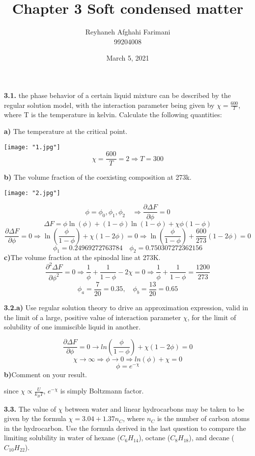 \documentclass[a4paper,12pt]{report}
\title{\large{\textbf{Chapter 3 Soft condensed matter}}}
\author{Reyhaneh Afghahi Farimani\\ 99204008}
\date{March 5, 2021}
\begin{document}
\maketitle
\textbf{3.1.} the phase behavior of a certain liquid mixture can be described by the regular solution model,
 with the interaction parameter being given by $\chi = \frac{600}{T}$,
  where T is the temperature in kelvin. Calculate the following quantities:

\textbf{a)} The temperature at the critical point.

\texttt{[image: "1.jpg"]}
\[
\chi = \frac{600}{T} = 2 \Rightarrow T =300
\]

\textbf{b)} The volume fraction of the coexisting composition at 273k.

\texttt{[image: "2.jpg"]}

\[\phi = \phi_0 , \phi_1 , \phi_2\quad 
\Rightarrow \frac{\partial \Delta F}{\partial \phi} = 0\]
\[
\Delta F = \phi \ln(\phi) +(1- \phi)\ln(1- \phi) + \chi \phi (1- \phi)
\]
\[
\frac{\partial \Delta F}{\partial \phi} = 0 
\Rightarrow \ln(\frac{\phi}{1-\phi}) + \chi (1 - 2\phi) =0  
\Rightarrow \ln(\frac{\phi}{1-\phi}) + \frac{600}{273} (1 - 2\phi) =0 
\]
\[
\phi_1 =  0.24969272763784 \quad \phi_2 = 0.750307272362156
\]
\textbf{c)}The volume fraction at the spinodal line at 273K.
\[
\frac{\partial^2 \Delta F}{\partial \phi^2} = 0 
\Rightarrow \frac{1}{\phi} + \frac{1}{1- \phi} -2\chi =0 
\Rightarrow \frac{1}{\phi} + \frac{1}{1- \phi} = \frac{1200}{273}
\]
\[
\phi_a = \frac{7}{20} =0.35 ,\quad \phi_b = \frac{13}{20} =0.65
\]

\textbf{3.2.a)}
Use regular solution theory to drive an approximation expression,
 valid in the limit of a large, positive value of interaction parameter $\chi$,
 for the limit of solubility of one immiscible liquid in another.

\[
 \frac{\partial \Delta F}{\partial \phi} = 0 
 \to ln(\frac{\phi}{1 - \phi}) + \chi (1 - 2 \phi) =0
\]
\[
\chi \to \infty \Rightarrow \phi \to 0 
\Rightarrow ln(\phi) +\chi =0 
\]
\[
\phi = e^{-\chi}
\]
\textbf{b)}Comment on your result.

since $\chi \propto \frac{U}{k_BT}$, $e^{-\chi}$ is simply Boltzmann factor.

\textbf{3.3.} The value of $\chi$ between water and linear hydrocarbons may 
be taken to be given by the formula $\chi = 3.04 + 1.37n_C$, 
where $n_C$ is the number of carbon atoms in the hydrocarbon. 
Use the formula derived in the last question to compare the 
limiting solubility in water of hexane ($C_6H_{14}$),
octane ($C_8H_{18}$), and decane ($C_{10}H_{22}$).
\end{document}
